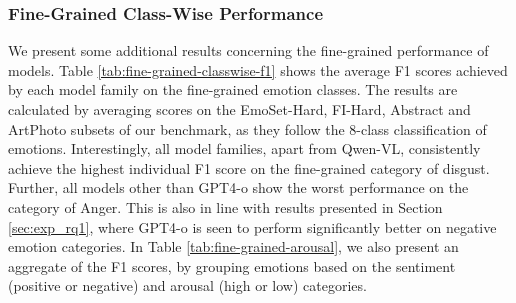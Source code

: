 \begin{table*}
    \centering
    \caption{Aggregated class-wise Recall scores for Simple Multimodal Classification. Model families include the Recall scores of each constituent model of different sizes (applicable for LLaVa and LLaVA-Next). The top-most Recall score achieved by each model family, across all fine-grained emotion classes, is highlighted in green, while the worst scores are shown in red.}
    \label{tab:fine-grained-classwise-recall}
\end{table*}


\subsubsection{Fine-Grained Class-Wise Performance}

We present some additional results concerning the fine-grained performance of models. Table \ref{tab:fine-grained-classwise-f1} shows the average F1 scores achieved by each model family on the fine-grained emotion classes. The results are calculated by averaging scores on the EmoSet-Hard, FI-Hard, Abstract and ArtPhoto subsets of our benchmark, as they follow the 8-class classification of emotions. Interestingly, all model families, apart from Qwen-VL, consistently achieve the highest individual F1 score on the fine-grained category of disgust. Further, all models other than GPT4-o show the worst performance on the category of Anger. This is also in line with results presented in Section \ref{sec:exp_rq1}, where GPT4-o is seen to perform significantly better on negative emotion categories. In Table \ref{tab:fine-grained-arousal}, we also present an aggregate of the F1 scores, by grouping emotions based on the sentiment (positive or negative) and arousal (high or low) categories. 

